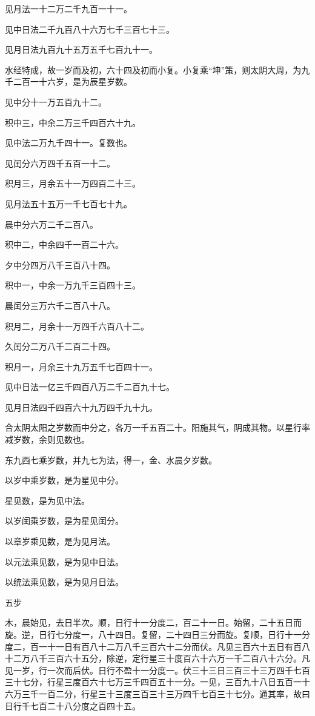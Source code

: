 \documentclass[]{article}
\begin{document}
见月法一十二万二千九百一十一。

见中日法二千九百八十六万七千三百七十三。

见月日法九百九十五万五千七百九十一。

水经特成，故一岁而及初，六十四及初而小复。小复乘``坤''策，则太阴大周，为九千二百一十六岁，是为辰星岁数。

见中分十一万五百九十二。

积中三，中余二万三千四百六十九。

见中法二万九千四十一。复数也。

见闰分六万四千五百一十二。

积月三，月余五十一万四百二十三。

见月法五十五万一千七百七十九。

晨中分六万二千二百八。

积中二，中余四千一百二十六。

夕中分四万八千三百八十四。

积中一，中余一万九千三百四十三。

晨闰分三万六千二百八十八。

积月二，月余十一万四千六百八十二。

久闰分二万八千二百二十四。

积月一，月余三十九万五千七百四十一。

见中日法一亿三千四百八万二千二百九十七。

见月日法四千四百六十九万四千九十九。

合太阴太阳之岁数而中分之，各万一千五百二十。阳施其气，阴成其物。以星行率减岁数，余则见数也。

东九西七乘岁数，并九七为法，得一，金、水晨夕岁数。

以岁中乘岁数，是为星见中分。

星见数，是为见中法。

以岁闰乘岁数，是为星见闰分。

以章岁乘见数，是为见月法。

以元法乘见数，是为见中日法。

以统法乘见数，是为见月日法。

五步

木，晨始见，去日半次。顺，日行十一分度二，百二十一日。始留，二十五日而旋。逆，日行七分度一，八十四日。复留，二十四日三分而旋。复顺，日行十一分度二，百一十一日有百八十二万八千三百六十二分而伏。凡见三百六十五日有百八十二万八千三百六十五分，除逆，定行星三十度百六十六万一千二百八十六分。凡见一岁，行一次而后伏。日行不盈十一分度一。伏三十三日三百三十三万四千七百三十七分，行星三度百六十七万三千四百五十一分。一见，三百九十八日五百一十六万三千一百二分，行星三十三度三百三十三万四千七百三十七分。通其率，故曰日行千七百二十八分度之百四十五。
\end{document}
